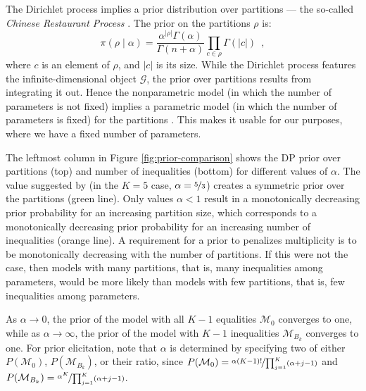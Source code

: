 \documentclass[11pt,a4paper]{article}
\theoremstyle{definition} %
\theoremstyle{case}
\begin{document}
The Dirichlet process implies a prior distribution over partitions --- the so-called \textit{Chinese Restaurant Process} \parencite[e.g.,][]{teh2010dirichlet}. The prior on the partitions $\rho$ is:
\begin{equation}
    \pi(\rho \mid \alpha) = \frac{\alpha^{|\rho|}\Gamma(\alpha)}{\Gamma(n + \alpha)} \prod_{c \in \rho} \Gamma(|c|) \enspace ,
\end{equation}
where $c$ is an element of $\rho$, and $|c|$ is its size. While the Dirichlet process features the infinite-dimensional object $\mathcal{G}$, the prior over partitions results from integrating it out. Hence the nonparametric model (in which the number of parameters is not fixed) implies a parametric model (in which the number of parameters is fixed) for the partitions \parencite{quintana2006predictive}. This makes it usable for our purposes, where we have a fixed number of parameters.

The leftmost column in Figure \ref{fig:prior-comparison} shows the DP prior over partitions (top) and number of inequalities (bottom) for different values of $\alpha$. The value suggested by \textcite{gopalan1998bayesian} (in the $K = 5$ case, $\alpha = \nicefrac{5}{3}$) creates a symmetric prior over the partitions (green line). Only values $\alpha < 1$ result in a monotonically decreasing prior probability for an increasing partition size, which corresponds to a monotonically decreasing prior probability for an increasing number of inequalities (orange line). A requirement for a prior to penalizes multiplicity is to be monotonically decreasing with the number of partitions. If this were not the case, then models with many partitions, that is, many inequalities among parameters, would be more likely than models with few partitions, that is, few inequalities among parameters.

As $\alpha \rightarrow 0$, the prior of the model with all $K - 1$ equalities $\mathcal{M}_0$ converges to one, while as $\alpha \rightarrow \infty$, the prior of the model with $K - 1$ inequalities $\mathcal{M}_{B_k}$ converges to one. For prior elicitation, \textcite{gopalan1998bayesian} note that $\alpha$ is determined by specifying two of either $P(\mathcal{M}_0)$, $P(\mathcal{M}_{B_k})$, or their ratio, since $P(\mathcal{M}_0) = \nicefrac{\alpha (K - 1)!}{\prod_{j = 1}^K (\alpha + j - 1)}$ and $P(\mathcal{M}_{B_k}) = \nicefrac{\alpha^K}{\prod_{j = 1}^K (\alpha + j - 1)}$.

\end{document}
